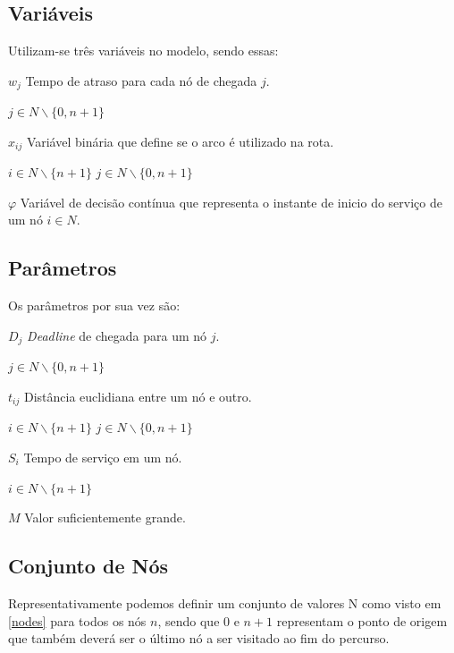 \documentclass[12pt]{article}
\begin{document}
\subsection{Variáveis}

Utilizam-se três variáveis no modelo, sendo essas:

$w_j$ Tempo de atraso para cada nó de chegada $j$.

\hspace{1.27cm} $j\in N\backslash \{0,n+1\}$

$x_{ij}$ Variável binária que define se o arco é utilizado na rota.

\hspace{1.27cm} $i\in N\backslash \{n+1\}$ \hspace{1.27cm}  $j\in N\backslash \{0,n+1\}$

$\varphi$ Variável de decisão contínua que representa o instante de inicio do serviço de um nó $i\in N$.


\subsection{Parâmetros}

Os parâmetros por sua vez são:

$D_j$ {\it Deadline} de chegada para um nó $j$.

\hspace{1.27cm} $j\in N\backslash \{0,n+1\}$

$t_{ij}$ Distância euclidiana entre um nó e outro.

\hspace{1.27cm} $i\in N\backslash \{n+1\}$ \hspace{1.27cm}  $j\in N\backslash \{0,n+1\}$

$S_i$ Tempo de serviço em um nó.

\hspace{1.27cm} $i\in N\backslash \{n+1\}$

$M$ Valor suficientemente grande.



\subsection{Conjunto de Nós}

Representativamente podemos definir um conjunto de valores N como visto em \eqref{nodes} para todos os nós $n$, sendo que 0 e $n+1$ representam o ponto de origem que também deverá ser o último nó a ser visitado ao fim do percurso.
\end{document}
